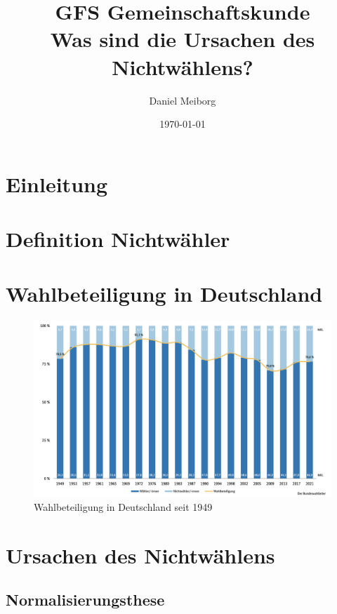 \documentclass[12pt]{article}
\title{
        {GFS Gemeinschaftskunde} \\
    {\large Was sind die Ursachen des Nichtwählens?}\\
}
\author{Daniel Meiborg}
\date{\today}
\begin{document}
    \maketitle
    \newpage

    \tableofcontents
    \newpage


    \section{Einleitung}


    \section{Definition Nichtwähler}
    \cite{bundeswahlleiter2021nichtwaehler}


    \section{Wahlbeteiligung in Deutschland}


    \begin{figure}
        \centering
        \includegraphics[width=\textwidth]{assets/Statistik-Wahlbeteiligung-Deutschland-seit-1949}
        \caption{Wahlbeteiligung in Deutschland seit 1949~\cite{bundeswahlleiter2021wahlbeteiligung}}
    \end{figure}


    \section{Ursachen des Nichtwählens}

    \subsection{Normalisierungsthese}
\end{document}

